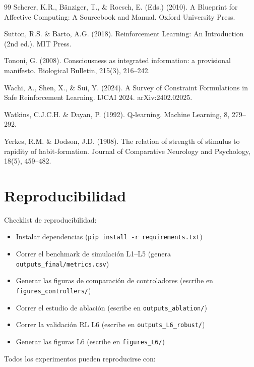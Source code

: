 \documentclass{article}
\begin{document}
\begin{thebibliography}{99}
Scherer, K.R., B\"anziger, T., \& Roesch, E. (Eds.) (2010). A Blueprint for Affective Computing: A Sourcebook and Manual. Oxford University Press.

Sutton, R.S. \& Barto, A.G. (2018). Reinforcement Learning: An Introduction (2nd ed.). MIT Press.


Tononi, G. (2008). Consciousness as integrated information: a provisional manifesto. Biological Bulletin, 215(3), 216--242.

Wachi, A., Shen, X., \& Sui, Y. (2024). A Survey of Constraint Formulations in Safe Reinforcement Learning. IJCAI 2024. arXiv:2402.02025.

Watkins, C.J.C.H. \& Dayan, P. (1992). Q-learning. Machine Learning, 8, 279--292.

Yerkes, R.M. \& Dodson, J.D. (1908). The relation of strength of stimulus to rapidity of habit-formation. Journal of Comparative Neurology and Psychology, 18(5), 459--482.

\end{thebibliography}

\appendix

\section{Reproducibilidad}

Checklist de reproducibilidad:
\begin{itemize}
    \item Instalar dependencias (\texttt{pip install -r requirements.txt})
    \item Correr el benchmark de simulación L1--L5 (genera \texttt{outputs\_final/metrics.csv})
    \item Generar las figuras de comparación de controladores (escribe en \texttt{figures\_controllers/})
    \item Correr el estudio de ablación (escribe en \texttt{outputs\_ablation/})
    \item Correr la validación RL L6 (escribe en \texttt{outputs\_L6\_robust/})
    \item Generar las figuras L6 (escribe en \texttt{figures\_L6/})
\end{itemize}

Todos los experimentos pueden reproducirse con:
\end{document}
